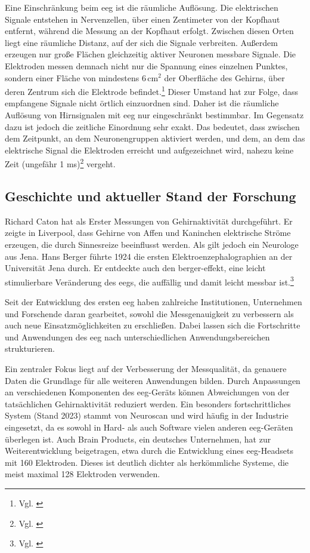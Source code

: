 Eine Einschränkung beim \acrshort{eeg} ist die räumliche Auflösung. Die elektrischen Signale entstehen in Nervenzellen, über einen Zentimeter von der Kopfhaut entfernt, während die Messung an der Kopfhaut erfolgt. Zwischen diesen Orten liegt eine räumliche Distanz, auf der sich die Signale verbreiten. Außerdem erzeugen nur große Flächen gleichzeitig aktiver Neuronen messbare Signale. Die Elektroden messen demnach nicht nur die Spannung eines einzelnen Punktes, sondern einer Fläche von mindestens 6\,cm$^2$ der Oberfläche des Gehirns, über deren Zentrum sich die Elektrode befindet.\footnote{Vgl. \cite[Appendix~1]{stlouis2016}} Dieser Umstand hat zur Folge, dass empfangene Signale nicht örtlich einzuordnen sind. Daher ist die räumliche Auflösung von Hirnsignalen mit \acrshort{eeg} nur eingeschränkt bestimmbar. Im Gegensatz dazu ist jedoch die zeitliche Einordnung sehr exakt. Das bedeutet, dass zwischen dem Zeitpunkt, an dem Neuronengruppen aktiviert werden, und dem, an dem das elektrische Signal die Elektroden erreicht und aufgezeichnet wird, nahezu keine Zeit (ungefähr 1 ms)\footnote{Vgl. \cite{tu_darmstadt2022}} vergeht. 

\subsection{Geschichte und aktueller Stand der Forschung}
Richard Caton hat als Erster Messungen von Gehirnaktivität durchgeführt. Er zeigte in Liverpool, dass Gehirne von Affen und Kaninchen elektrische Ströme erzeugen, die durch Sinnesreize beeinflusst werden. Als  gilt jedoch ein Neurologe aus Jena. Hans Berger führte 1924 die ersten Elektroenzephalographien an der Universität Jena durch. Er entdeckte auch den \gls{berger-effekt}, eine leicht stimulierbare Veränderung des \acrshort{eeg}s, die auffällig und damit leicht messbar ist.\footnote{Vgl. \cite[S.~1165--1167]{caeira2023_berger}}

Seit der Entwicklung des ersten \acrshort{eeg} haben zahlreiche Institutionen, Unternehmen und Forschende daran gearbeitet, sowohl die Messgenauigkeit zu verbessern als auch neue Einsatzmöglichkeiten zu erschließen. Dabei lassen sich die Fortschritte und Anwendungen des \acrshort{eeg} nach unterschiedlichen Anwendungsbereichen strukturieren.

Ein zentraler Fokus liegt auf der Verbesserung der Messqualität, da genauere Daten die Grundlage für alle weiteren Anwendungen bilden. Durch Anpassungen an verschiedenen Komponenten des \acrshort{eeg}-Geräts können Abweichungen von der tatsächlichen Gehirnaktivität reduziert werden. Ein besonders fortschrittliches System (Stand 2023) stammt von Neuroscan und wird häufig in der Industrie eingesetzt, da es sowohl in Hard- als auch Software vielen anderen \acrshort{eeg}-Geräten überlegen ist. Auch Brain Products, ein deutsches Unternehmen, hat zur Weiterentwicklung beigetragen, etwa durch die Entwicklung eines \acrshort{eeg}-Headsets mit 160 Elektroden. Dieses ist deutlich dichter als herkömmliche Systeme, die meist maximal 128 Elektroden verwenden.

